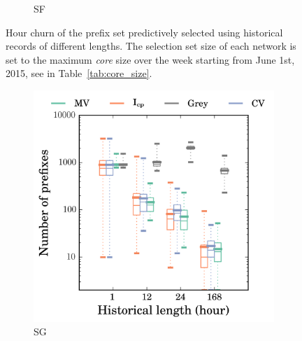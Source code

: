 \begin{figure}
\begin{subfigure}[b]{0.48\textwidth}
                \caption{SF}
                \label{fig:churn_sf}
        \end{subfigure}
\caption{Hour churn of the prefix set predictively selected using historical records of different lengths. The selection set size of each network is set to the maximum \textit{core} size over the week starting from June 1st, 2015, see in Table~\ref{tab:core_size}.}
\label{fig:churn}
\end{figure}

\begin{figure}\ContinuedFloat
	\centering 
        \begin{subfigure}[b]{0.48\textwidth}
                \includegraphics[width=\textwidth]{gfx/chap2/grey_churn_box_method_compare_fs_sg.png}
                \caption{SG}
                \label{fig:churn_sg}
        \end{subfigure}
        \begin{subfigure}[b]{0.48\textwidth}

\end{subfigure}
\end{figure}
